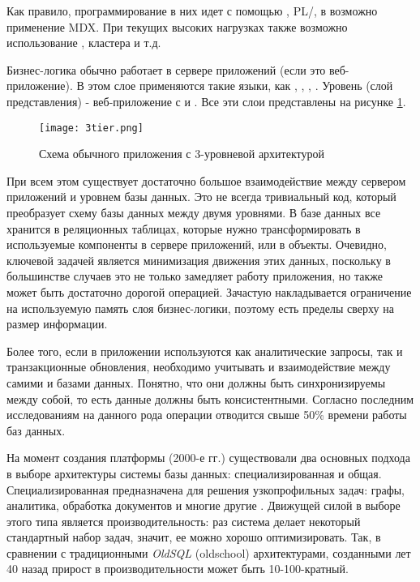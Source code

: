 Как правило, программирование в них идет с помощью \sql, PL/\sql, в \olap возможно применение MDX. При текущих высоких нагрузках также возможно использование \nosql, \hadoop кластера и т.д.

Бизнес-логика обычно работает в сервере приложений (если это веб-приложение). В этом слое применяются такие языки, как \java, \csharp, \python, \scala.
Уровень \ui (слой представления) - веб-приложение с \html и \js. Все эти слои представлены на рисунке \ref{fig:technology:logicblox:three_tier_architecture}.

\begin{figure}
	\centering
	\texttt{[image: 3tier.png]}
	\caption{Схема обычного приложения с 3-уровневой архитектурой}
	\label{fig:technology:logicblox:three_tier_architecture}
\end{figure}

При всем этом существует достаточно большое взаимодействие между сервером приложений и уровнем базы данных. Это не всегда тривиальный код, который преобразует схему базы данных между двумя уровнями. В базе данных все хранится в реляционных таблицах, которые нужно трансформировать в используемые компоненты в сервере приложений, или в объекты. Очевидно, ключевой задачей является минимизация движения этих данных, поскольку в большинстве случаев это не только замедляет работу приложения, но также может быть достаточно дорогой операцией. Зачастую накладывается ограничение на используемую память слоя бизнес-логики, поэтому есть пределы сверху на размер информации.

Более того, если в приложении используются как аналитические запросы, так и транзакционные обновления, необходимо учитывать и взаимодействие между самими \olap и \oltp базами данных. Понятно, что они должны быть синхронизируемы между собой, то есть данные должны быть консистентными. Согласно последним исследованиям на данного рода операции отводится свыше 50\% времени работы баз данных.

На момент создания платформы (2000-е гг.) существовали два основных подхода в выборе архитектуры системы базы данных: специализированная и общая. Специализированная предназначена для решения узкопрофильных задач: графы, аналитика, обработка документов и многие другие \cite{one_size_fits_all}. Движущей силой в выборе этого типа является производительность: раз система делает некоторый стандартный набор задач, значит, ее можно хорошо оптимизировать. Так, в сравнении с традиционными \emph{OldSQL} (oldschool) архитектурами, созданными лет 40 назад прирост в производительности может быть 10-100-кратный.

